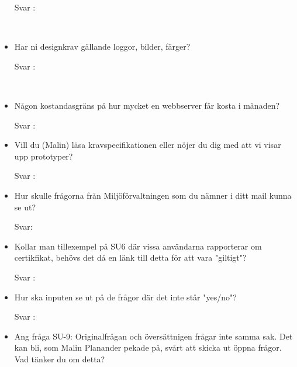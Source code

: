 \documentclass{article}
\begin{document}
\begin{itemize}
        \begin{description}
            \item[Svar :]
        \end{description}
    \\
    \item  Har ni designkrav gällande loggor, bilder, färger?
     \begin{description}
            \item[Svar :]
        \end{description}
    \\
    \item Någon kostandasgräns på hur mycket en webbserver får kosta i månaden?
        \begin{description}
            \item[Svar :]
        \end{description}
        \item Vill du (Malin) läsa kravspecifikationen
        eller nöjer du dig med att vi visar upp
        prototyper?
         \begin{description}
            \item[Svar :]
        \end{description}

        \item Hur skulle frågorna från Miljöförvaltningen som du nämner i ditt mail kunna se ut?
        \begin{description}
        	\item[Svar:]
\end{description}      

     \item Kollar man tillexempel på SU6 där vissa användarna rapporterar om certikfikat, behövs det då en länk till detta för att vara "giltigt"? 
    
        \begin{description}
            \item[Svar :]
        \end{description}
        
             \item Hur ska inputen se ut på de frågor där det inte står "yes/no"? 
    
        \begin{description}
            \item[Svar :]
        \end{description}
        
         \item Ang fråga SU-9: Originalfrågan och översättnigen frågar inte samma sak. Det kan bli, som Malin Planander pekade på, svårt att skicka ut öppna frågor. Vad tänker du om detta?
    

\end{itemize}
\end{document}
